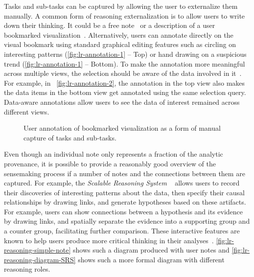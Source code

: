 Tasks and sub-tasks can be captured by allowing the user to externalize them manually. A common form of reasoning externalization is to allow users to write down their thinking. It could be a free note~\cite{Shrinivasan2008} or a description of a user bookmarked visualization~\cite{Heer2009,Walker2013}. Alternatively, users can annotate directly on the visual bookmark using standard graphical editing features such as circling on interesting patterns (\autoref{fig:lr-annotation-1} -- Top) or hand drawing on a suspicious trend (\autoref{fig:lr-annotation-1} -- Bottom). To make the annotation more meaningful across multiple views, the selection should be aware of the data involved in it~\cite{Heer2008a}. For example, in~ \autoref{fig:lr-annotation-2}, the annotation in the top view also makes the data items in the bottom view get annotated using the same selection query. Data-aware annotations allow users to see the data of interest remained across different views.

\begin{figure}[!htb]
\centering
{} 
\hfill
{}
\caption{User annotation of bookmarked visualization as a form of manual capture of tasks and sub-tasks. }
\label{fig:lr-annotation}
\end{figure}

Even though an individual note only represents a fraction of the analytic provenance, it is possible to provide a reasonably good overview of the sensemaking process if a number of notes and the connections between them are captured. For example, the \emph{Scalable Reasoning System} ~\cite{Pike2009} allows users to record their discoveries of interesting patterns about the data, then specify their causal relationships by drawing links, and generate hypotheses based on these artifacts. For example, users can show connections between a hypothesis and its evidence by drawing links, and spatially separate the evidence into a supporting group and a counter group, facilitating further comparison. These interactive features are known to help users produce more critical thinking in their analyses~\cite{Sedig2013}.  \autoref{fig:lr-reasoning-simple-note} shows such a diagram produced with user notes and \autoref{fig:lr-reasoning-diagram-SRS} shows such a more formal diagram with different reasoning roles.

